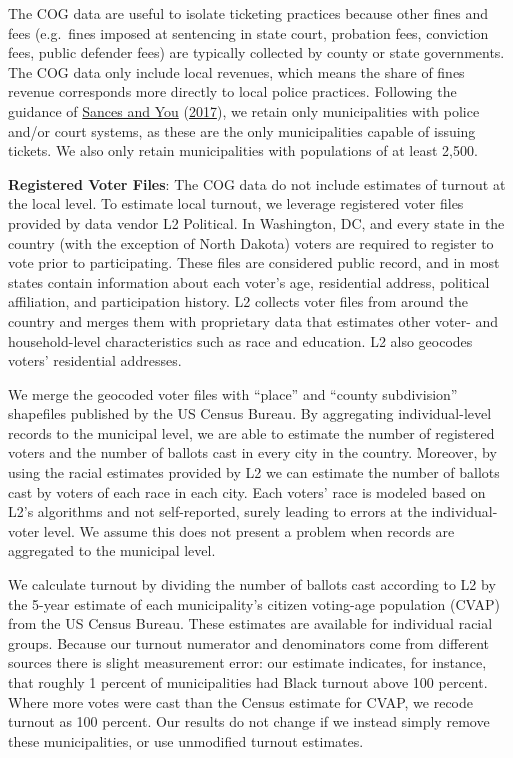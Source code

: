 \documentclass[
  12pt,
]{article}
\begin{document}
The COG data are useful to isolate ticketing practices because other fines and fees (e.g.~fines imposed at sentencing in state court, probation fees, conviction fees, public defender fees) are typically collected by county or state governments. The COG data only include local revenues, which means the share of fines revenue corresponds more directly to local police practices. Following the guidance of \protect\hyperlink{ref-Sances2017}{Sances and You} (\protect\hyperlink{ref-Sances2017}{2017}), we retain only municipalities with police and/or court systems, as these are the only municipalities capable of issuing tickets. We also only retain municipalities with populations of at least 2,500.

\textbf{Registered Voter Files}: The COG data do not include estimates of turnout at the local level. To estimate local turnout, we leverage registered voter files provided by data vendor L2 Political. In Washington, DC, and every state in the country (with the exception of North Dakota) voters are required to register to vote prior to participating. These files are considered public record, and in most states contain information about each voter's age, residential address, political affiliation, and participation history. L2 collects voter files from around the country and merges them with proprietary data that estimates other voter- and household-level characteristics such as race and education. L2 also geocodes voters' residential addresses.

We merge the geocoded voter files with ``place'' and ``county subdivision'' shapefiles published by the US Census Bureau. By aggregating individual-level records to the municipal level, we are able to estimate the number of registered voters and the number of ballots cast in every city in the country. Moreover, by using the racial estimates provided by L2 we can estimate the number of ballots cast by voters of each race in each city. Each voters' race is modeled based on L2's algorithms and not self-reported, surely leading to errors at the individual-voter level. We assume this does not present a problem when records are aggregated to the municipal level.

We calculate turnout by dividing the number of ballots cast according to L2 by the 5-year estimate of each municipality's citizen voting-age population (CVAP) from the US Census Bureau. These estimates are available for individual racial groups. Because our turnout numerator and denominators come from different sources there is slight measurement error: our estimate indicates, for instance, that roughly 1 percent of municipalities had Black turnout above 100 percent. Where more votes were cast than the Census estimate for CVAP, we recode turnout as 100 percent. Our results do not change if we instead simply remove these municipalities, or use unmodified turnout estimates.
\end{document}
